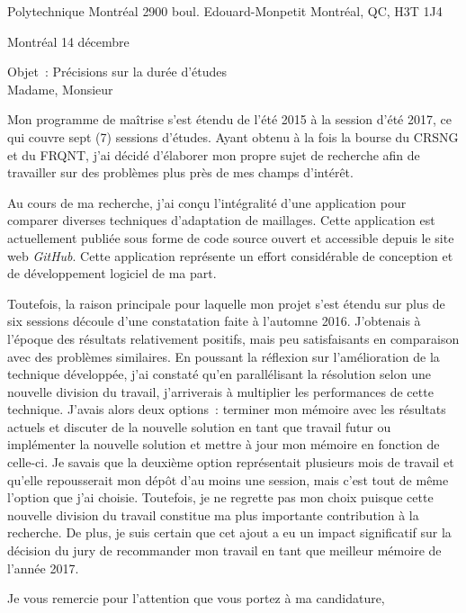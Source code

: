 \clurecipient
 {Polytechnique Montréal}
 {2900 boul. Edouard-Monpetit}
 {Montréal, QC, H3T 1J4}
 
\cllocationdate
 {Montréal}
 {14 décembre}
 
Objet~: Précisions sur la durée d’études\\
 
\clgreeting
 {Madame, Monsieur}
 
Mon programme de maîtrise s’est étendu de l’été 2015 à la session d’été 2017, ce qui couvre sept (7) sessions d’études. Ayant obtenu à la fois la bourse du CRSNG et du FRQNT, j’ai décidé d’élaborer mon propre sujet de recherche afin de travailler sur des problèmes plus près de mes champs d’intérêt.

Au cours de ma recherche, j’ai conçu l’intégralité d’une application pour comparer diverses techniques d’adaptation de maillages. Cette application est actuellement publiée sous forme de code source ouvert et accessible depuis le site web \textit{GitHub}. Cette application représente un effort considérable de conception et de développement logiciel de ma part.

Toutefois, la raison principale pour laquelle mon projet s’est étendu sur plus de six sessions découle d’une constatation faite à l’automne 2016. J’obtenais à l’époque des résultats relativement positifs, mais peu satisfaisants en comparaison avec des problèmes similaires. En poussant la réflexion sur l’amélioration de la technique développée, j’ai constaté qu’en parallélisant la résolution selon une nouvelle division du travail, j’arriverais à multiplier les performances de cette technique. J’avais alors deux options~: terminer mon mémoire avec les résultats actuels et discuter de la nouvelle solution en tant que travail futur ou implémenter la nouvelle solution et mettre à jour mon mémoire en fonction de celle-ci. Je savais que la deuxième option représentait plusieurs mois de travail et qu’elle repousserait mon dépôt d’au moins une session, mais c’est tout de même l’option que j’ai choisie. Toutefois, je ne regrette pas mon choix puisque cette nouvelle division du travail constitue ma plus importante contribution à la recherche. De plus, je suis certain que cet ajout a eu un impact significatif sur la décision du jury de recommander mon travail en tant que meilleur mémoire de l’année 2017.

Je vous remercie pour l’attention que vous portez à ma candidature,
